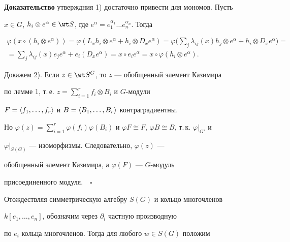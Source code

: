 


{\bf Доказательство} утверждния 1) достаточно привести для мономов. Пусть


$x\in G$, $h_i\otimes e^\alpha\in\wt S$, где $e^\alpha=e^{\alpha_1}_1\dotsc 


e^{\alpha_n}_n$. Тогда 


\begin{multline*} 


\varphi(x\circ(h_i\otimes e^\alpha))=\varphi(L_x h_i 


\otimes e^\alpha+h_i\otimes D_x e^\alpha)=\varphi 


\bigg(\sum_j \lambda_{ij}(x)h_j\otimes e^\alpha+ 


h_i\otimes D_x e^\alpha\bigg)= \\ 


% 


=\sum_j \lambda_{ij}(x)e_j e^\alpha+e_i(D_x e^\alpha)= 


x\circ e_i e^\alpha=x\circ\varphi(h_i\otimes e^\alpha). 


\end{multline*} 


 


 


Докажем 2). Если $z\in\wt S^G$, то $z$ --- обобщенный элемент Казимира 


по лемме 1, т.\,е. $z=\sum\limits^r_{i=1}f_i\otimes B_i$ и $G$-модули 


$F=\langle f_1,\dotsc,f_r\rangle$ и $B=\langle B_1,\dotsc,B_r\rangle$ контраградиентны. 


Но $\varphi(z)=\sum\limits^r_{i=1}\varphi(f_i)\varphi(B_i)$ и $\varphi 


F\cong F$, $\varphi B\cong B$, т.\,к. $\varphi|_{G'}$ и 


$\varphi|_{S(G)}$ --- изоморфизмы. Следовательно, $\varphi(z)$ --- 


обобщенный элемент Казимира, а $\varphi(F)$ --- $G$-модуль 


присоединенного модуля.$\quad\square$ 


\medskip 


 


Отождествляя симметрическую алгебру $S(G)$ и кольцо многочленов 


$k[e_1,\dotsc,e_n]$, обозначим через $\partial_i$ частную производную 


по $e_i$ кольца многочленов. Тогда для любого $w\in S(G)$ положим 


